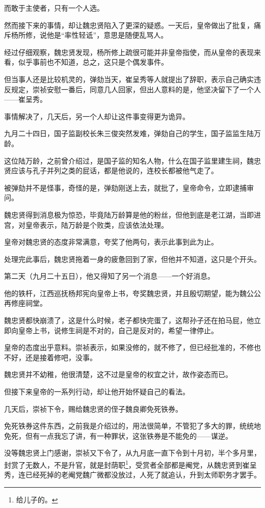 \begin{multicols}{\theparacolNo}
		而敢于主使者，只有一个人选。

		然而接下来的事情，却让魏忠贤陷入了更深的疑惑。一天后，皇帝做出了批复，痛斥杨所修，说他是“率性轻诋”，意思是随便乱骂人。

		经过仔细观察，魏忠贤发现，杨所修上疏很可能并非皇帝指使，而从皇帝的表现来看，似乎事前也不知道，总之，这只是个偶发事件。

		但当事人还是比较机灵的，弹劾当天，崔呈秀等人就提出了辞职，表示自己确实违反规定，崇祯安慰一番后，同意几人回家，但出人意料的是，他坚决留下了一个人——崔呈秀。

		事情解决了，几天后，另一个人却让这件事变得更为诡异。

		九月二十四日，国子监副校长朱三俊突然发难，弹劾自己的学生，国子监监生陆万龄。

		这位陆万龄，之前曾介绍过，是国子监的知名人物，什么在国子监里建生祠，魏忠贤应该与孔子并列之类的屁话，都是他说的，连校长都被他气走了。

		被弹劾并不是怪事，奇怪的是，弹劾刚送上去，就批了，皇帝命令，立即逮捕审问。

		魏忠贤得到消息极为惊恐，毕竟陆万龄算是他的粉丝，但他到底是老江湖，当即进宫，对皇帝表示，陆万龄是个败类，应该依法处理。

		皇帝对魏忠贤的态度非常满意，夸奖了他两句，表示此事到此为止。

		处理完此事后，魏忠贤拖着一身的疲惫回到了家，但他并不知道，这只是个开头。

		第二天（九月二十五日），他又得知了另一个消息——一个好消息。

		他的铁杆，江西巡抚杨邦宪向皇帝上书，夸奖魏忠贤，并且殷切期望，能为魏公公再修座祠堂。

		魏忠贤都快崩溃了，这是什么时候，老子都快完蛋了，这帮孙子还在拍马屁，他立即向皇帝上书，说修生祠是不对的，自己是反对的，希望一律停止。

		皇帝的态度出乎意料。崇祯表示，如果没修的，就不修了，但已经批准的，不修也不好，还是接着修吧，没事。

		魏忠贤并不幼稚，他很清楚，这不过是皇帝的权宜之计，故作姿态而已。

		但接下来皇帝的一系列行动，却让他开始怀疑自己的看法。

		几天后，崇祯下令，赐给魏忠贤的侄子魏良卿免死铁券。

		免死铁券这件东西，之前我是介绍过的，用法很简单，不管犯了多大的罪，统统地免死，但有一点我忘了讲，有一种罪状，这张铁券是不能免的——谋逆。

		没等魏忠贤上门感谢，崇祯又下令了，从九月底一直下令到十月初，半个多月里，封赏了无数人，不是升官，就是封荫职\footnote{给儿子的。}，受赏者全部都是阉党，从魏忠贤到崔呈秀，连已经死掉的老阉党魏广微都没放过，人死了就追认，升到太师职务才罢手。


\end{multicols}
